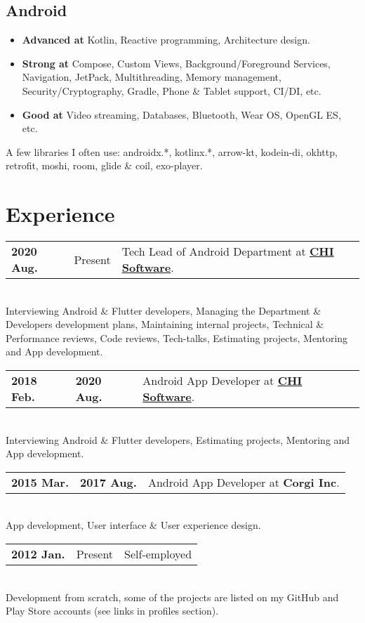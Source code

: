 \documentclass[a4paper]{article}
\begin{document}
	\subsection*{Android}
	\begin{multicols}{2}
	\begin{itemize}
		\item \textbf{Advanced at} Kotlin, Reactive programming, Architecture design.
		\item \textbf{Strong at} Compose, Custom Views, Background/Foreground Services, Navigation, JetPack, Multithreading, Memory management, Security/Cryptography, Gradle, Phone \& Tablet support, CI/DI, etc.
		\item \textbf{Good at} Video streaming, Databases, Bluetooth, Wear OS, OpenGL ES, etc.
	\end{itemize}
	\end{multicols}
	
	{ \footnotesize
	A few libraries I often use: androidx.*, kotlinx.*, arrow-kt, kodein-di, okhttp, retrofit, moshi, room, glide \& coil, exo-player.       
	}
	
	\section*{Experience}
	\begin{tabular}{@{}l@{\enspace--\enspace}ll}
		\textbf{2020 Aug.} & Present & Tech Lead of Android Department at \href{https://chisw.com}{\textbf{CHI Software}}. \\
	\end{tabular} \\[0.2em]
	Interviewing Android \& Flutter developers, Managing the Department \& Developers development plans, Maintaining internal projects, Technical \& Performance reviews, Code reviews, Tech-talks, Estimating projects, Mentoring and App development. \\[0.4em]
	\begin{tabular}{@{}l@{\enspace--\enspace}ll}
		\textbf{2018 Feb.} & \textbf{2020 Aug.} & Android App Developer at \href{https://chisw.com}{\textbf{CHI Software}}. \\
	\end{tabular} \\[0.2em]
	Interviewing Android \& Flutter developers, Estimating projects, Mentoring and App development.  \\[0.4em]   
	\begin{tabular}{@{}l@{\enspace--\enspace}ll}
		\textbf{2015 Mar.} & \textbf{2017 Aug.} & Android App Developer at \textbf{Corgi Inc}. \\
	\end{tabular} \\[0.2em]
	App development, User interface \& User experience design.   \\[0.4em]   
	\begin{tabular}{@{}l@{\enspace--\enspace}ll}
		\textbf{2012 Jan.} & Present & Self-employed \\
	\end{tabular} \\[0.2em]
	Development from scratch, some of the projects are listed on my GitHub and Play Store accounts (see links in profiles section).   
\end{document}
